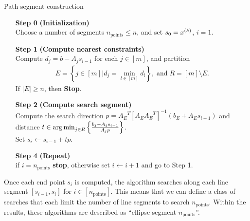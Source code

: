 {
\begin{fullwidth}[leftmargin=0in, rightmargin=0in, width=\linewidth-0.25in]
\begin{flushleft}


\begin{algorithm}[H]
    \caption{Path segment construction}
    \label{segment_construction}
    \begin{itemize}
        \item[\textbf{Step 0}] \textbf{(Initialization)} \\
            Choose a number of segments $n_{\text{points}} \le n$, and set $s_0 = x^{(k)}$, $i=1$.
            
        \item[\textbf{Step 1}] \textbf{(Compute nearest constraints)} \\
			Compute $d_j = b - A_j s_{i-1}$ for each $j \in [m]$, and partition 
			\begin{align*}
			E = \left\{j \in [m] \bigg| d_j = \min_{l \in [m]} d_l\right\}, \; \textrm{and} \; R = [m] \setminus E.
			\end{align*}
			If $|E| \ge n$, then \textbf{Stop}.
			
            
        \item[\textbf{Step 2}] \textbf{(Compute search segment)} \\
        	Compute the search direction $p = {A_E}^T\left[A_E{A_E}^T\right]^{-1}\left(b_E + A_E s_{i-1}\right)$
        	and distance $t \in \operatorname*{arg\,min}_{j \in R} \left\{\frac{b_j - A_j s_{i-1}}{A_jp}  \right\}$. \\
        	Set $s_i \gets s_{i-1} + tp$.
        	
        \item[\textbf{Step 4}] \textbf{(Repeat)} \\
        if $i = n_{\text{points}}$ \textbf{stop}, otherwise set $i \gets i+1$ and go to Step 1.
    \end{itemize}
\end{algorithm}

\end{flushleft}
\end{fullwidth}
}



Once each end point $s_i$ is computed, the algorithm searches along each line segment $[s_{i-1}, s_i]$ for $i \in [n_{\text{points}}]$.
This means that we can define a class of searches that each limit the number of line segments to search $n_{\text{points}}$.
Within the results, these algorithms are described as ``ellipse segment $n_{\text{points}}$''.

